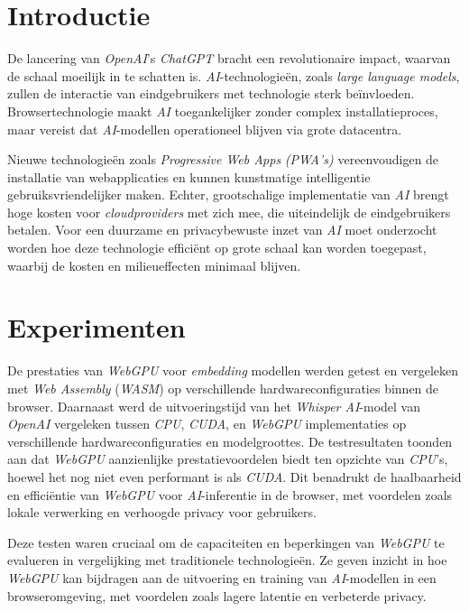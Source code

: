 \documentclass[a0,portrait]{hogent-poster}
\begin{document}
\begin{multicols}{2} %

\section{Introductie}

De lancering van \textit{OpenAI}'s \textit{ChatGPT} bracht een revolutionaire impact, waarvan de schaal moeilijk in te schatten is. \textit{AI}-technologieën, zoals \textit{large language models}, zullen de interactie van eindgebruikers met technologie sterk beïnvloeden. Browsertechnologie maakt \textit{AI} toegankelijker zonder complex installatieproces, maar vereist dat \textit{AI}-modellen operationeel blijven via grote datacentra.

Nieuwe technologieën zoals \textit{Progressive Web Apps} \textit{(PWA's)} vereenvoudigen de installatie van webapplicaties en kunnen kunstmatige intelligentie gebruiksvriendelijker maken. Echter, grootschalige implementatie van \textit{AI} brengt hoge kosten voor \textit{cloudproviders} met zich mee, die uiteindelijk de eindgebruikers betalen. Voor een duurzame en privacybewuste inzet van \textit{AI} moet onderzocht worden hoe deze technologie efficiënt op grote schaal kan worden toegepast, waarbij de kosten en milieueffecten minimaal blijven.

\section{Experimenten}

De prestaties van \textit{WebGPU} voor \textit{embedding} modellen werden getest en vergeleken met \textit{Web Assembly} (\textit{WASM}) op verschillende hardwareconfiguraties binnen de browser. Daarnaast werd de uitvoeringstijd van het \textit{Whisper AI}-model van \textit{OpenAI} vergeleken tussen \textit{CPU}, \textit{CUDA}, en \textit{WebGPU} implementaties op verschillende hardwareconfiguraties en modelgroottes. De testresultaten toonden aan dat \textit{WebGPU} aanzienlijke prestatievoordelen biedt ten opzichte van \textit{CPU}'s, hoewel het nog niet even performant is als \textit{CUDA}. Dit benadrukt de haalbaarheid en efficiëntie van \textit{WebGPU} voor \textit{AI}-inferentie in de browser, met voordelen zoals lokale verwerking en verhoogde privacy voor gebruikers.

Deze testen waren cruciaal om de capaciteiten en beperkingen van \textit{WebGPU} te evalueren in vergelijking met traditionele technologieën. Ze geven inzicht in hoe \textit{WebGPU} kan bijdragen aan de uitvoering en training van \textit{AI}-modellen in een browseromgeving, met voordelen zoals lagere latentie en verbeterde privacy.


\end{multicols}
\end{document}
